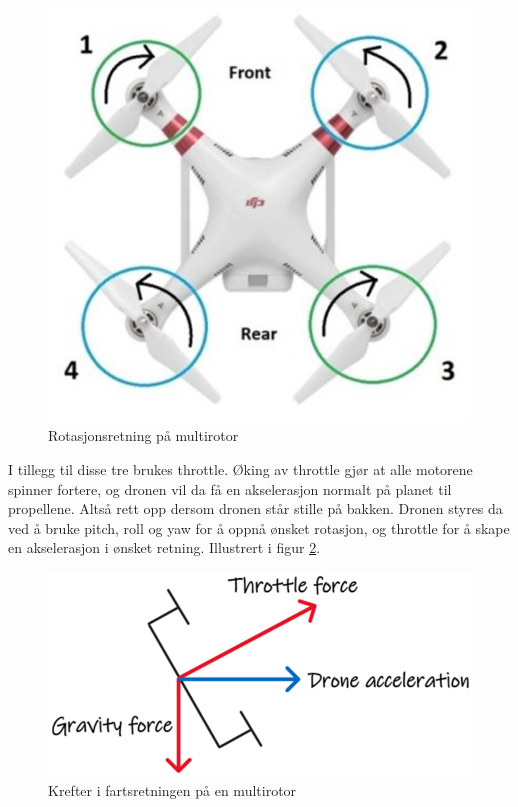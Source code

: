 \begin{figure}[htp]
    \centering
    \includegraphics[width=0.4\columnwidth]{figures/motor-rotasjon}
    \caption{Rotasjonsretning på multirotor}
    \label{fig:motor-rotasjon}
\end{figure}

I tillegg til disse tre brukes throttle. Øking av throttle gjør at alle motorene spinner fortere, og dronen vil da få en akselerasjon normalt på planet til propellene. Altså rett opp dersom dronen står stille på bakken.
Dronen styres da ved å bruke pitch, roll og yaw for å oppnå ønsket rotasjon, og throttle for å skape en akselerasjon i ønsket retning. Illustrert i figur \ref{fig:krefter-pa-drone}. 

\begin{figure}[htp]
    \centering
    \includegraphics[width=0.5\columnwidth]{figures/krefter-pa-drone}
    \caption{Krefter i fartsretningen på en multirotor}
    \label{fig:krefter-pa-drone}
\end{figure}